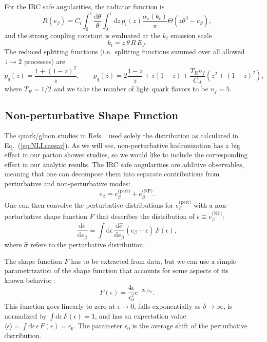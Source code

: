 \documentclass[11pt,letterpaper]{article}
\newcommand{\df}{\text{d}}
\newcommand{\vev}[1]{\langle #1 \rangle}
\DeclareRobustCommand{\Eq}[1]{Eq.~(\ref{#1})}
\DeclareRobustCommand{\Refs}[1]{Refs.~\cite{#1}}
\newcommand{\be}{\begin{equation}}
\newcommand{\ee}{\end{equation}}
\begin{document}
For the IRC safe angularities, the radiator function is \cite{}
\begin{equation} \label{eq:radiatorC1}
R(e_\beta) = C_i \int_0^{1} \frac{\df \theta}{\theta}\int_0^1 \df  z\, p_i(z) \frac{\alpha_s(k_t)}{\pi} \Theta\left(z \theta^\beta -e_\beta \right),
\end{equation}
and the strong coupling constant is evaluated at the $k_t$ emission scale
\be
k_t = z \, \theta \,  R \, E_J.
\ee
The reduced splitting functions (i.e.~splitting functions summed over all allowed $1 \to 2$ processes) are 
\be
p_q(z) = \frac{1 + (1-z)^2}{z}, \qquad p_q(z) = 2 \frac{1-z}{z} + z(1-z) + \frac{T_R n_f}{C_A} (z^2 + (1-z)^2),
\ee
where $T_R = 1/2$ and we take the number of light quark flavors to be $n_f = 5$.

\subsection{Non-perturbative Shape Function}
\label{subsec:shapefuncdef}

The quark/gluon studies in \Refs{} used solely the distribution as calculated in \Eq{eq:NLLcaesar}.  As we will see, non-perturbative hadronization has a big effect in our parton shower studies, so we would like to include the corresponding effect in our analytic results.  The IRC safe angularities are additive observables, meaning that one can decompose them into separate contributions from perturbative and non-perturbative modes:
\be
e_\beta = e_\beta^{\text{(pert)}} + e_\beta^{\text{(NP)}}.
\ee
One can then convolve the perturbative distributions for $e_\beta^{\text{(pert)}}$ with a non-perturbative shape function $F$ that describes the distribution of $\epsilon \equiv e_\beta^{\text{(NP)}}$:
\be
\frac{\df \sigma}{\df e_\beta} = \int \df \epsilon \,  \frac{\df \hat{\sigma}}{\df e_\beta}(e_\beta - \epsilon) \, F(\epsilon),
\ee
where $\hat{\sigma}$ refers to the perturbative distribution.

The shape function $F$ has to be extracted from data, but we can use a simple parametrization of the shape function that accounts for some aspects of its known behavior \cite{}:
\be
F(\epsilon) = \frac{4 \epsilon}{\epsilon_0^2} e^{-2 \epsilon/\epsilon_0}.
\ee
This function goes linearly to zero at $\epsilon \to 0$, falls exponentially as $\delta \to \infty$, is normalized by $\int \df \epsilon \,  F(\epsilon) = 1$, and has an expectation value $\vev{\epsilon} = \int \df \epsilon \, \epsilon \, F(\epsilon) = \epsilon_0$.  The parameter $\epsilon_0$ is the average shift of the perturbative distribution.
\end{document}
